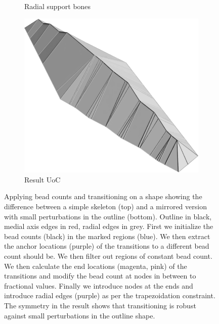 \begin{figure}
\begin{subfigure}{\figwidth}
\caption{Radial support bones}\label{beading_transitioning_filtering__transitions_applied}
\end{subfigure}
\begin{subfigure}{.27\textwidth}
\hspace*{-.5cm}\includegraphics[width=1.2\columnwidth]{sources/method/beading_transitioning_filtering__result_uoc.png}
\caption{Result UoC}\label{beading_transitioning_filtering__result_uoc}
\end{subfigure}
\caption{
Applying bead counts and transitioning on a shape showing the difference between a simple skeleton (top) and a mirrored version with small perturbations in the outline (bottom).
Outline in black, medial axis edges in red, radial edges in grey.
 First we initialize the bead counts (black) in the marked regions (blue).
 We then extract the anchor locations (purple) of the transitions to a different bead count should be.
 We then filter out regions of constant bead count.
 We then calculate the end locations (magenta, pink) of the transitions and modify the bead count at nodes in between to fractional values.
 Finally we introduce nodes at the ends and introduce radial edges (purple) as per the trapezoidation constraint.
The symmetry in the result shows that transitioning is robust against small perturbations in the outline shape.
}
\label{beading_transitioning_filtering}
\end{figure}


